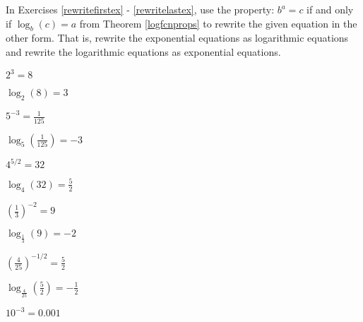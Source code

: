 \documentclass{ximera}
\begin{document}
	\author{Stitz-Zeager}


\begin{question}
In Exercises \ref{rewritefirstex} - \ref{rewritelastex}, use the property: $b^{a} = c$ if and only if $\log_{b}(c) = a$ from Theorem \ref{logfcnprops} to rewrite the given equation in the other form.  That is, rewrite the exponential equations as logarithmic equations and rewrite the logarithmic equations as exponential equations.

\begin{problem}\label{rewritefirstex}
$2^{3} = 8$

\begin{solution}
    $\log_{2}(8) = 3$
\end{solution}
\end{problem}

\begin{problem}
$5^{-3} = \frac{1}{125}$

\begin{solution}
    $\log_{5}\left(\frac{1}{125}\right) = -3$
\end{solution}
\end{problem}

\begin{problem}
$4^{5/2} = 32$ 

\begin{solution}
$\log_{4}(32) = \frac{5}{2}$
\end{solution}
\end{problem}

\begin{problem}
$\left(\frac{1}{3}\right)^{-2} = 9$ 

\begin{solution}
    $\log_{\frac{1}{3}}(9) = -2$
\end{solution}
\end{problem}

\begin{problem}
$\left(\frac{4}{25}\right)^{-1/2} = \frac{5}{2}$  

\begin{solution}
    $\log_{\frac{4}{25}}\left(\frac{5}{2}\right) = -\frac{1}{2}$
\end{solution}
\end{problem}

\begin{problem}
$10^{-3} = 0.001$ 


\end{problem}
\end{question}
\end{document}
